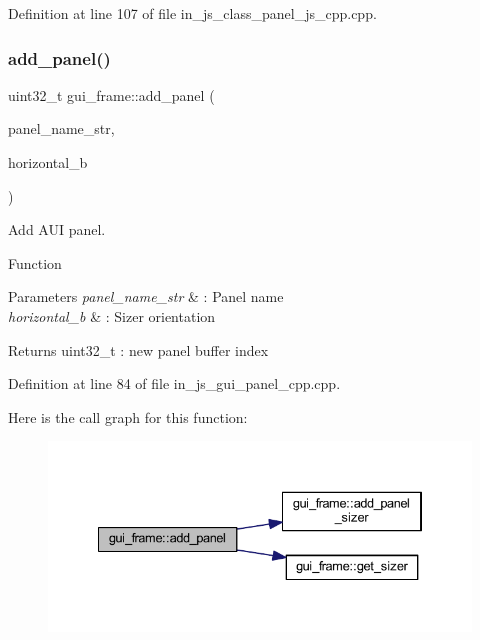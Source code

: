 Definition at line 107 of file in\+\_\+js\+\_\+class\+\_\+panel\+\_\+js\+\_\+cpp.\+cpp.

\mbox{\label{group___panel_ga2d79c673338b47e8788f54bdf65798a1}} 
\subsubsection{add\_panel()}
{\footnotesize\ttfamily uint32\+\_\+t gui\+\_\+frame\+::add\+\_\+panel (\begin{DoxyParamCaption}\item[{wx\+String}]{panel\+\_\+name\+\_\+str,  }\item[{bool}]{horizontal\+\_\+b }\end{DoxyParamCaption})}



Add A\+UI panel. 

Function
\begin{DoxyParams}{Parameters}
{\em panel\+\_\+name\+\_\+str} & \+: Panel name \\
\hline
{\em horizontal\+\_\+b} & \+: Sizer orientation \\
\hline
\end{DoxyParams}
\begin{DoxyReturn}{Returns}
uint32\+\_\+t \+: new panel buffer index 
\end{DoxyReturn}


Definition at line 84 of file in\+\_\+js\+\_\+gui\+\_\+panel\+\_\+cpp.\+cpp.

Here is the call graph for this function\+:
\nopagebreak
\begin{figure}[H]
\begin{center}
\leavevmode
\includegraphics[width=334pt]{group___panel_ga2d79c673338b47e8788f54bdf65798a1_cgraph}
\end{center}
\end{figure}
\mbox{\label{group___panel_ga6dcbb59740d4ae113377045278b54007}} 
